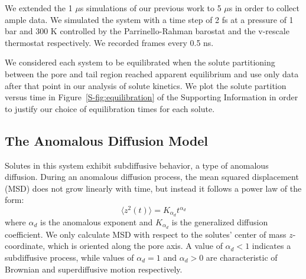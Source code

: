\documentclass{article}
\begin{document}
  We extended the 1 $\mu$s simulations of our previous work to 5 $\mu$s in order
  to collect ample data. We simulated the system with a time step of 2 fs at a pressure
  of 1 bar and 300 K controlled by the Parrinello-Rahman barostat and the v-rescale 
  thermostat respectively. We recorded frames every 0.5 ns.
  
  We considered each system to be equilibrated when the solute partitioning between the 
  pore and tail region reached apparent equilibrium and use only data after that point
  in our analysis of solute kinetics. We plot the solute partition versus time in
  Figure~\ref{S-fig:equilibration} of the Supporting Information in order to justify 
  our choice of equilibration times for each solute.

  \subsection{The Anomalous Diffusion Model}\label{method:model_sFBM}

  Solutes in this system exhibit subdiffusive behavior, a type of anomalous diffusion.
  During an anomalous diffusion process, the mean squared displacement (MSD)
  does not grow linearly with time, but instead it follows a power law of the form:
  \begin{equation} 
  \langle z^2(t) \rangle = K_{\alpha_d}t^{\alpha_d}
  \label{eqn:msd_form}
  \end{equation} 
  where $\alpha_d$ is the anomalous exponent and $K_{\alpha_d}$ is the generalized 
  diffusion coefficient. We only calculate MSD with respect to the solutes' center of
  mass $z$-coordinate, which is oriented along the pore axis. A value of $\alpha_d < 1$
  indicates a subdiffusive process, while values of $\alpha_d = 1$ and $\alpha_d > 0$ 
  are characteristic of Brownian and superdiffusive motion respectively.
  
\end{document}
